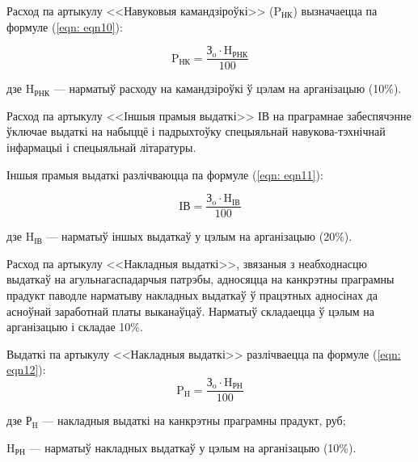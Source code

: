 Расход па артыкулу <<Навуковыя камандзіроўкі>> ($\text{P}_\text{НК}$) вызначаецца па формуле (\ref{eqn: eqn10}):

\begin{equation}
    \label{eqn: eqn10}
    \text{P}_\text{НК} = \frac{\text{З}_\text{o} \cdot \text{H}_\text{РНК}}{100}
\end{equation}
\begin{Explanation}
    \item[дзе] $\text{H}_\text{РНК}$ --- нарматыў расходу на камандзіроўкі ў цэлам на арганізацыю (10\%).
\end{Explanation}

Расход па артыкулу <<Іншыя прамыя выдаткі>> $\text{ІВ}$ на праграмнае забеспячэнне ўключае выдаткі на набыццё і падрыхтоўку спецыяльнай навукова-тэхнічнай інфармацыі і спецыяльнай літаратуры.

Іншыя прамыя выдаткі разлічваюцца па формуле (\ref{eqn: eqn11}):

\begin{equation}
    \label{eqn: eqn11}
    \text{ІВ} = \frac{\text{З}_\text{o} \cdot \text{H}_\text{ІВ}}{100}
\end{equation}
\begin{Explanation}
    \item[дзе] $\text{H}_\text{ІВ}$ --- нарматыў іншых выдаткаў у цэлым на арганізацыю (20\%).
\end{Explanation}

Расход па артыкулу <<Накладныя выдаткі>>, звязаныя з неабходнасцю
выдаткаў на агульнагаспадарчыя патрэбы, адносяцца на канкрэтны праграмны прадукт
паводле нарматыву накладных выдаткаў ў працэтных адносінах да асноўнай заработнай платы выканаўцаў. Нарматыў складаецца ў цэлым на арганізацыю і складае 10\%.

Выдаткі па артыкулу <<Накладныя выдаткі>> разлічваецца па формуле (\ref{eqn: eqn12}):
\begin{equation}
    \label{eqn: eqn12}
    \text{P}_\text{H} = \frac{\text{З}_\text{o} \cdot \text{H}_\text{РН}}{100}
\end{equation}
\begin{Explanation}
    \item[дзе] $\text{Р}_\text{H}$ --- накладныя выдаткі на канкрэтны праграмны прадукт, руб;
    \item $\text{H}_\text{РН}$ --- нарматыў накладных выдаткаў у цэлым на арганізацыю (10\%).
\end{Explanation}

